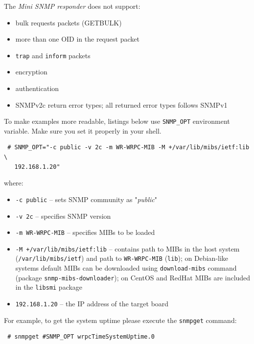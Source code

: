\documentclass[a4paper, 12pt]{article}
\begin{document}
The \textit{Mini SNMP responder} does not support:
\begin{itemize}
   \item bulk requests packets (GETBULK)
   \item more than one OID in the request packet
   \item \texttt{trap} and \texttt{inform} packets
   \item encryption
   \item authentication
   \item SNMPv2c return error types; all returned error types follows SNMPv1
\end{itemize}

To make examples more readable, listings below use \texttt{SNMP\_OPT} environment
variable. Make sure you set it properly in your shell.
\begin{lstlisting}
 # SNMP_OPT="-c public -v 2c -m WR-WRPC-MIB -M +/var/lib/mibs/ietf:lib \
   192.168.1.20"
\end{lstlisting}
where:
\begin{itemize}
   \item \texttt{-c public} -- sets SNMP community as "\textit{public}"
   \item \texttt{-v 2c} -- specifies SNMP version
   \item \texttt{-m WR-WRPC-MIB} -- specifies MIBs to be loaded
   \item \texttt{-M +/var/lib/mibs/ietf:lib} -- contains path to MIBs in the host
         system (\texttt{/var/lib/mibs/ietf}) and path to \texttt{WR-WRPC-MIB} (\texttt{lib});
         on Debian-like systems default MIBs can be downloaded using
         \texttt{download-mibs} command (package \texttt{snmp-mibs-downloader}); on
         CentOS and RedHat MIBs are included in the \texttt{libsmi} package
   \item \texttt{192.168.1.20} -- the IP address of the target board
\end{itemize}

For example, to get the system uptime please execute the \texttt{snmpget} command:
\begin{lstlisting}
 # snmpget #SNMP_OPT wrpcTimeSystemUptime.0
\end{lstlisting}
\end{document}
